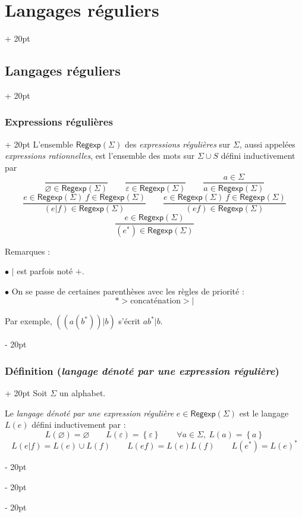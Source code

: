 \documentclass[a4paper, 12pt, twoside]{article}
\newcommand{\lr}[1]{\left( #1 \right)}
\newcommand{\set}[1]{\left\{ #1 \right\}}
\newcommand{\ind}[1][20pt]{\advance\leftskip + #1}
\newcommand{\deind}[1][20pt]{\advance\leftskip - #1}
\newenvironment{indt}[2][20pt]{#2 \par \ind[#1]}{\par \deind} %
\newcommand{\Regexp}{\mathsf{Regexp}}
\begin{document}
\begin{indt}{\section{Langages réguliers}}
\begin{indt}{\subsection{Langages réguliers}}
\begin{indt}{\subsubsection{Expressions régulières}}
                L'ensemble $\Regexp(\Sigma)$ des \emph{expressions régulières} sur $\Sigma$, aussi appelées \emph{expressions rationnelles}, est l'ensemble des mots sur $\Sigma \cup S$ défini inductivement par
                \[
                    \dfrac{}{\varnothing \in \Regexp(\Sigma)}
                    \qquad
                    \dfrac{}{\varepsilon \in \Regexp(\Sigma)}
                    \qquad
                    \dfrac{a \in \Sigma}{a \in \Regexp(\Sigma)}
                \]
                \[
                    \dfrac{e \in \Regexp(\Sigma)\ f \in \Regexp(\Sigma)}{(e | f) \in \Regexp(\Sigma)}
                    \qquad
                    \dfrac{e \in \Regexp(\Sigma)\ f \in \Regexp(\Sigma)}{(ef) \in \Regexp(\Sigma)}
                \]
                \[
                    \dfrac{e \in \Regexp(\Sigma)}{(e^*) \in \Regexp(\Sigma)}
                \]

                Remarques :

                $\bullet$ $|$ est parfois noté $+$.

                $\bullet$ On se passe de certaines parenthèses avec les règles de priorité :
                \[
                    * > \text{concaténation} > |
                \]

                Par exemple, $\lr{\lr{a\lr{b^*}} | b}$ s'écrit $a b^* | b$.
            \end{indt}

            \vspace{12pt}
            
            \begin{indt}{\subsubsection{Définition (\textit{langage dénoté par une expression régulière})}}
                Soit $\Sigma$ un alphabet.

                Le \emph{langage dénoté par une expression régulière} $e \in \Regexp(\Sigma)$ est le langage $L(e)$ défini inductivement par :
                \[
                    L(\varnothing) = \varnothing
                    \qquad
                    L(\varepsilon) = \set \varepsilon
                    \qquad
                    \forall a \in \Sigma,\ L(a) = \set a
                \]
                \[
                    L(e | f) = L(e) \cup L(f)
                    \qquad
                    L(ef) = L(e) L(f)
                    \qquad
                    L(e^*) = L(e)^*
                \]


\end{indt}
\end{indt}
\end{indt}
\end{document}
